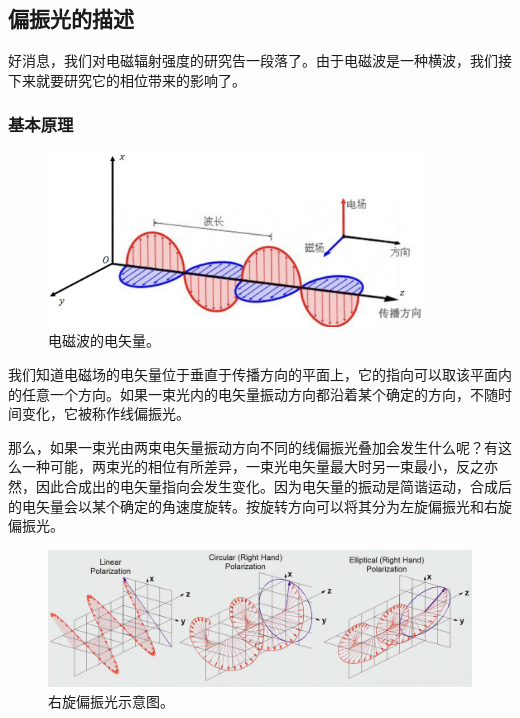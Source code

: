 \documentclass[../天体物理基础.tex]{subfiles}
\begin{document}
\newpage
\subsection{偏振光的描述}
好消息，我们对电磁辐射强度的研究告一段落了。由于电磁波是一种横波，我们接下来就要研究它的相位带来的影响了。

\subsubsection{基本原理}
\begin{figure}[!htbp]
\centering
\includegraphics[width=10cm]{figures/figure1_2.png}
\captionsetup{justification=raggedright, singlelinecheck=false}
\caption{电磁波的电矢量。}
\label{电磁波的电矢量。}
\end{figure}

我们知道电磁场的电矢量位于垂直于传播方向的平面上，它的指向可以取该平面内的任意一个方向。如果一束光内的电矢量振动方向都沿着某个确定的方向，不随时间变化，它被称作线偏振光。

那么，如果一束光由两束电矢量振动方向不同的线偏振光叠加会发生什么呢？有这么一种可能，两束光的相位有所差异，一束光电矢量最大时另一束最小，反之亦然，因此合成出的电矢量指向会发生变化。因为电矢量的振动是简谐运动，合成后的电矢量会以某个确定的角速度旋转。按旋转方向可以将其分为左旋偏振光和右旋偏振光。
\begin{figure}[!htbp]
\centering
\includegraphics[width=17cm]{figures/figure1_3.png}
\captionsetup{justification=raggedright, singlelinecheck=false}
\caption{右旋偏振光示意图。}
\label{右旋偏振光示意图。}
\end{figure}
\end{document}
